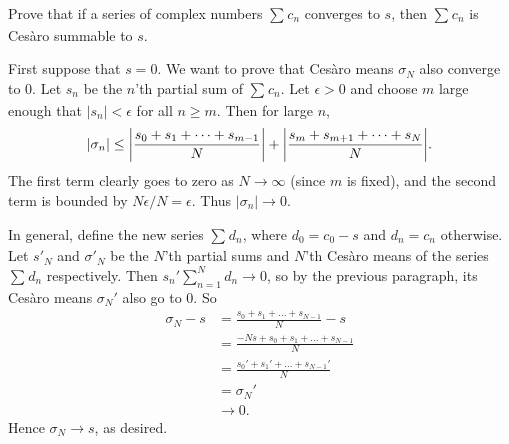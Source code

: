\begin{exrc}[12]
    Prove that if a series of complex numbers \(\sum_{}^{} c_n\) converges to \(s\),
    then \(\sum_{}^{} c_n\) is Cesàro summable to \(s\).

\begin{soln}
    First suppose that \(s = 0\).
    We want to prove that Cesàro means \(\sigma_N\) also converge to 0.
    Let \(s_n\) be the \(n\)'th partial sum of \(\sum_{}^{} c_n\).
    Let \(\epsilon > 0\) and
    choose \(m\) large enough that \(|s_n| < \epsilon\) for all \(n \geq m\).
    Then for large \(n\),
    \begin{equation*}
        |\sigma_n| 
        \leq \abs{\frac{s_0 + s_1 + \cdots + s_{m - 1}}{N}} + 
        \abs{\frac{s_m + s_{m + 1} + \cdots + s_N}{N}}.
    \end{equation*}
    The first term clearly goes to zero as \(N \to \infty\) (since \(m\) is fixed),
    and the second term is bounded by \(N \epsilon / N = \epsilon\).
    Thus \(|\sigma_n| \to 0\).

    In general, define the new series \(\sum_{}^{} d_n\),
    where \(d_0 = c_0 - s\) and \(d_n = c_{n}\) otherwise.
    Let \(s'_N\) and \(\sigma'_N\) be the \(N\)'th partial sums and \(N\)'th Cesàro means 
    of the series \(\sum_{}^{} d_n\) respectively.
    Then \(s_n' \sum_{n = 1}^{N} d_n \to 0\), so by the previous paragraph,
    its Cesàro means \(\sigma_N'\) also go to 0.
    So
    \begin{align*}
        \sigma_N - s
        &= \frac{s_0 + s_1 + \ldots + s_{N - 1}}{N} - s \\
        &= \frac{-Ns + s_0 + s_1 + \ldots + s_{N - 1}}{N} \\
        &= \frac{s_0' + s_1' + \ldots + s_{N - 1}'}{N} \\
        &= \sigma_N' \\
        & \to 0.
    \end{align*}
    Hence \(\sigma_N \to s\), as desired.



    
\end{soln}
\end{exrc}
